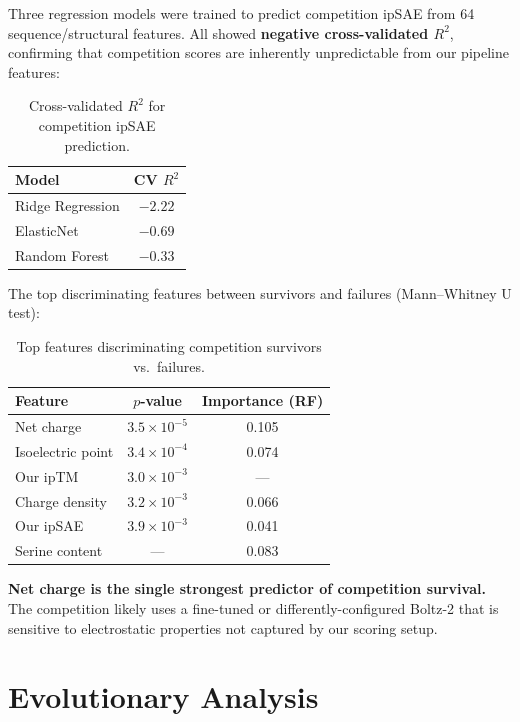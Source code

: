 \documentclass[11pt,a4paper]{article}
\begin{document}
Three regression models were trained to predict competition ipSAE from 64 sequence/structural features. All showed \textbf{negative cross-validated $R^2$}, confirming that competition scores are inherently unpredictable from our pipeline features:

\begin{table}[H]
\centering
\caption{Cross-validated $R^2$ for competition ipSAE prediction.}
\begin{tabular}{lc}
\toprule
\textbf{Model} & \textbf{CV $R^2$} \\
\midrule
Ridge Regression     & $-2.22$ \\
ElasticNet           & $-0.69$ \\
Random Forest        & $-0.33$ \\
\bottomrule
\end{tabular}
\end{table}

The top discriminating features between survivors and failures (Mann--Whitney U test):

\begin{table}[H]
\centering
\caption{Top features discriminating competition survivors vs.\ failures.}
\begin{tabular}{lcc}
\toprule
\textbf{Feature} & \textbf{$p$-value} & \textbf{Importance (RF)} \\
\midrule
Net charge         & $3.5 \times 10^{-5}$ & 0.105 \\
Isoelectric point  & $3.4 \times 10^{-4}$ & 0.074 \\
Our ipTM           & $3.0 \times 10^{-3}$ & ---   \\
Charge density     & $3.2 \times 10^{-3}$ & 0.066 \\
Our ipSAE          & $3.9 \times 10^{-3}$ & 0.041 \\
Serine content     & ---                   & 0.083 \\
\bottomrule
\end{tabular}
\end{table}

\textbf{Net charge is the single strongest predictor of competition survival.} The competition likely uses a fine-tuned or differently-configured Boltz-2 that is sensitive to electrostatic properties not captured by our scoring setup.

\section{Evolutionary Analysis}
\end{document}
